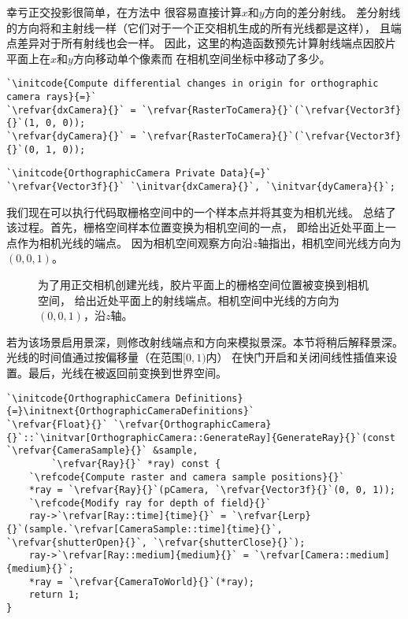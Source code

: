 幸亏正交投影很简单，在方法中
很容易直接计算$x$和$y$方向的差分射线。
差分射线的方向将和主射线一样（它们对于一个正交相机生成的所有光线都是这样），
且端点差异对于所有射线也会一样。
因此，这里的构造函数预先计算射线端点因胶片平面上在$x$和$y$方向移动单个像素而
在相机空间坐标中移动了多少。
\begin{lstlisting}
`\initcode{Compute differential changes in origin for orthographic camera rays}{=}`
`\refvar{dxCamera}{}` = `\refvar{RasterToCamera}{}`(`\refvar{Vector3f}{}`(1, 0, 0));
`\refvar{dyCamera}{}` = `\refvar{RasterToCamera}{}`(`\refvar{Vector3f}{}`(0, 1, 0));
\end{lstlisting}
\begin{lstlisting}
`\initcode{OrthographicCamera Private Data}{=}`
`\refvar{Vector3f}{}` `\initvar{dxCamera}{}`, `\initvar{dyCamera}{}`;
\end{lstlisting}

我们现在可以执行代码取栅格空间中的一个样本点并将其变为相机光线。
总结了该过程。首先，栅格空间样本位置变换为相机空间的一点，
即给出近处平面上一点作为相机光线的端点。
因为相机空间观察方向沿$z$轴指出，相机空间光线方向为$(0,0,1)$。

\begin{figure}[htbp]
    \centering
    \caption{为了用正交相机创建光线，胶片平面上的栅格空间位置被变换到相机空间，
    给出近处平面上的射线端点。相机空间中光线的方向为$(0,0,1)$，沿$z$轴。}
    \label{fig:6.4}
\end{figure}

若为该场景启用景深，则修改射线端点和方向来模拟景深。本节将稍后解释景深。
光线的时间值通过按偏移量（在范围$[0,1)$内）
在快门开启和关闭间线性插值来设置。最后，光线在被返回前变换到世界空间。
\begin{lstlisting}
`\initcode{OrthographicCamera Definitions}{=}\initnext{OrthographicCameraDefinitions}`
`\refvar{Float}{}` `\refvar{OrthographicCamera}{}`::`\initvar[OrthographicCamera::GenerateRay]{GenerateRay}{}`(const `\refvar{CameraSample}{}` &sample,
        `\refvar{Ray}{}` *ray) const {
    `\refcode{Compute raster and camera sample positions}{}`
    *ray = `\refvar{Ray}{}`(pCamera, `\refvar{Vector3f}{}`(0, 0, 1));
    `\refcode{Modify ray for depth of field}{}`
    ray->`\refvar[Ray::time]{time}{}` = `\refvar{Lerp}{}`(sample.`\refvar[CameraSample::time]{time}{}`, `\refvar{shutterOpen}{}`, `\refvar{shutterClose}{}`);
    ray->`\refvar[Ray::medium]{medium}{}` = `\refvar[Camera::medium]{medium}{}`;
    *ray = `\refvar{CameraToWorld}{}`(*ray);
    return 1;
}
\end{lstlisting}

